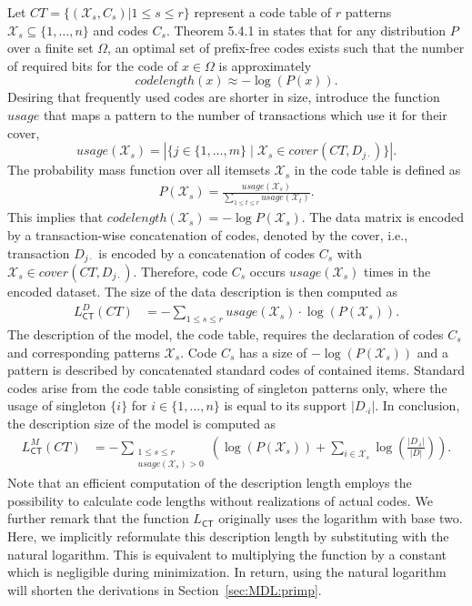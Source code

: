 Let $CT=\{(\mathcal{X}_s,C_s)|1\leq s\leq r\}$ represent a code table of $r$ patterns $\mathcal{X}_s\subseteq\{1,\ldots,n\}$ and codes $C_s$. Theorem 5.4.1 in \cite{cover2012elements} states that for any distribution $P$ over a finite set $\Omega$, an optimal set of prefix-free codes exists such that the number of required bits for the code of $x\in\Omega$ is approximately
\begin{equation*}
	codelength(x) \approx -\log(P(x)).
\end{equation*}
Desiring that frequently used codes are shorter in size, \cite{siebes2006item} introduce the function $usage$ that maps a pattern to the number of transactions which use it for their cover,
\[usage(\mathcal{X}_s)=|\{j\in\{1,\ldots,m\}\mid \mathcal{X}_s\in cover(CT,D_{j\cdot})\}|.\] 
The probability mass function over all itemsets $\mathcal{X}_s$ in the code table  is defined as
\begin{align}\label{eq:krimpCodeProb}
P(\mathcal{X}_s) = \frac{usage(\mathcal{X}_s)}{\sum_{1\leq t \leq r}usage(\mathcal{X}_t)}.
\end{align}
This implies that $codelength(\mathcal{X}_s)=-\log P(\mathcal{X}_s)$. The data matrix is encoded by a transaction-wise concatenation of codes, denoted by the cover, i.e., transaction $D_{j\cdot}$ is encoded by a concatenation of codes $C_s$ with $\mathcal{X}_s\in cover(CT,D_{j\cdot})$. Therefore, code $C_s$ occurs $usage(\mathcal{X}_s)$ times in the encoded dataset. The size of the data description is then computed as
\begin{align*}
	L^D_{\mathsf{CT}}(CT)
    &=-\sum_{1\leq s\leq r} usage(\mathcal{X}_s) \cdot \log(P(\mathcal{X}_s)).
\end{align*}
The description of the model, the code table, requires the declaration of codes $C_s$ and corresponding patterns $\mathcal{X}_s$. Code $C_s$ has a size of $-\log\left(P(\mathcal{X}_s)\right)$ and a pattern is described by concatenated standard codes of contained items. Standard codes arise from the code table consisting of singleton patterns only, where the usage of singleton $\{i\}$ for $i\in\{1,\ldots,n\}$ is equal to its support $|D_{\cdot i}|$. In conclusion, the description size of the model is computed as  
\begin{align*}
	L_{\mathsf{CT}}^M(CT)
    &= -\sum_{\substack{1\leq s\leq r \\ usage(\mathcal{X}_s)>0}}\left(\log\left(P(\mathcal{X}_s)\right) +\sum_{i\in \mathcal{X}_s}\log\left(\frac{|D_{\cdot i}|}{|D|}\right)\right).
\end{align*}
Note that an efficient computation of the description length employs the possibility to calculate code lengths without realizations of actual codes.
We further remark that the function $L_{\mathsf{CT}}$ originally uses the logarithm with base two. Here, we implicitly reformulate this description length by substituting with the natural logarithm. This is equivalent to multiplying the function by a constant which is negligible during minimization. In return, using the natural logarithm will shorten the derivations in Section~\ref{sec:MDL:primp}.

